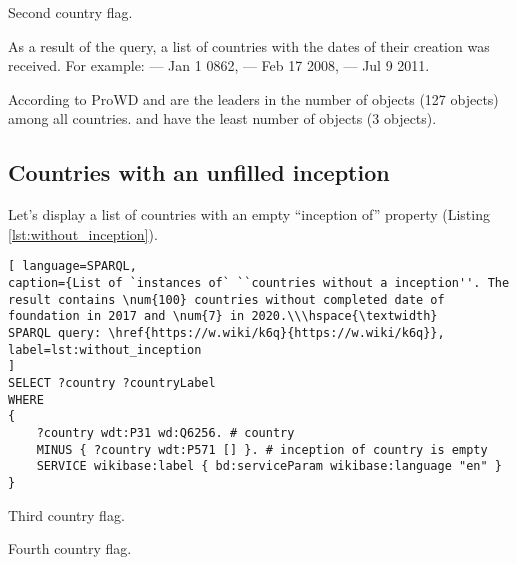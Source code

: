 \begin{marginfigure}[3.2cm]
	{
		\setlength{\fboxsep}{0pt}%
		\setlength{\fboxrule}{1pt}%
	}
	\caption{Second country flag.}%
	\label{fig:flag_mongolia}%
\end{marginfigure}

As a result of the query, a list of countries with the dates of their creation was received. For example:  --- Jan 1 0862,  --- Feb 17 2008,  --- Jul 9 2011.

According to ProWD  and  are the leaders in the number of objects (127 objects) among all countries.  and  have the least number of objects (3 objects).


\subsection{Countries with an unfilled inception}

Let's display a list of countries with an empty ``inception of'' property (Listing \ref{lst:without_inception}).

\begin{lstlisting}[ language=SPARQL, 
caption={List of `instances of` ``countries without a inception''. The result contains \num{100} countries without completed date of foundation in 2017 and \num{7} in 2020.\\\hspace{\textwidth}
SPARQL query: \href{https://w.wiki/k6q}{https://w.wiki/k6q}},
label=lst:without_inception
]
SELECT ?country ?countryLabel 
WHERE
{
	?country wdt:P31 wd:Q6256. # country
	MINUS { ?country wdt:P571 [] }. # inception of country is empty
	SERVICE wikibase:label { bd:serviceParam wikibase:language "en" }
}
\end{lstlisting}

\begin{marginfigure}
	{
		\setlength{\fboxsep}{0pt}%
		\setlength{\fboxrule}{1pt}%
	}
	\caption{Third country flag.}%
	\label{fig:flag_singapore}%
\end{marginfigure}

\begin{marginfigure}
	{
		\setlength{\fboxsep}{0pt}%
		\setlength{\fboxrule}{1pt}%
	}
	\caption{Fourth country flag.}%
	\label{fig:flag_israel}%
\end{marginfigure}

